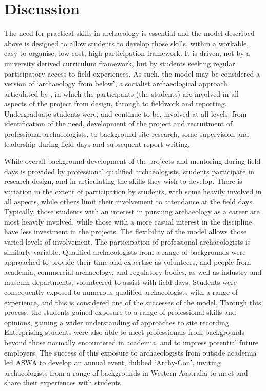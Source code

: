 \documentclass{ijsra}
\begin{document}
\section{Discussion}

The need for practical skills in archaeology is essential \parencites{boytner2012}{cobb2012}{colley2012}{mytum2012a}{mytum2012b}{ulm2013} and the model described above is designed to allow students to develop those skills, within a workable, easy to organise, low cost, high participation framework. 
It is driven, not by a university derived curriculum framework, but by students seeking regular participatory access to field experiences. As such, the model may be considered a version of ‘archaeology from below’, a socialist archaeological approach articulated by \textcite{faulkner2000}, in which the participants (the students) are involved in all aspects of the project from design, through to fieldwork and reporting. 
Undergraduate students were, and continue to be, involved at all levels, from identification of the need, development of the project and recruitment of professional archaeologists, to background site research, some supervision and leadership during field days and subsequent report writing.

While overall background development of the projects and mentoring during field days is provided by professional qualified archaeologists, students participate in research design, and in articulating the skills they wish to develop. 
There is variation in the extent of participation by students, with some heavily involved in all aspects, while others limit their involvement to attendance at the field days. 
Typically, those students with an interest in pursuing archaeology as a career are most heavily involved, while those with a more casual interest in the discipline have less investment in the projects. The flexibility of the model allows those varied levels of involvement. The participation of professional archaeologists is similarly variable. 
Qualified archaeologists from a range of backgrounds were approached to provide their time and expertise as volunteers, and people from academia, commercial archaeology, and regulatory bodies, as well as industry and museum departments, volunteered to assist with field days. 
Students were consequently exposed to numerous qualified archaeologists with a range of experience, and this is considered one of the successes of the model. Through this process, the students gained exposure to a range of professional skills and opinions, gaining a wider understanding of approaches to site recording. 
Enterprising students were also able to meet professionals from backgrounds beyond those normally encountered in academia, and to impress potential future employers. 
The success of this exposure to archaeologists from outside academia led ASWA to develop an annual event, dubbed ‘Archy-Con’, inviting archaeologists from a range of backgrounds in Western Australia to meet and share their experiences with students.
\end{document}
